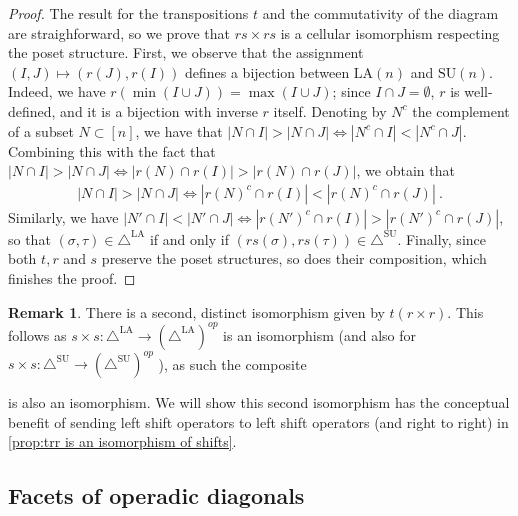 \documentclass{amsart}
\theoremstyle{definition}
\newtheorem{remark}[theorem]{Remark}
\newcommand{\SU}{\mathrm{SU}}
\newcommand{\LA}{\mathrm{LA}}
\newcommand{\SUD}{\triangle^{\mathrm{SU}}}
\newcommand{\LAD}{\triangle^{\mathrm{LA}}}
\newcommand{\op}{\mathrm{op}}
\begin{document}
\begin{proof}
    The result for the transpositions $t$ and the commutativity of the diagram are straighforward, so we prove that $rs\times rs$ is a cellular isomorphism respecting the poset structure. 
    First, we observe that the assignment $(I,J) \mapsto (r(J),r(I))$ defines a bijection between $\LA(n)$ and $\SU(n)$. 
    Indeed, we have $r(\min(I\cup J))=\max(I\cup J)$; since $I \cap J = \emptyset$, $r$ is well-defined, and it is a bijection with inverse $r$ itself.  
    Denoting by $N^c$ the complement of a subset $N \subset [n]$, we have that $|N \cap I| > |N\cap J| \iff |N^c \cap I|< |N^c \cap J|$.
    Combining this with the fact that $|N \cap I| > |N\cap J| \iff |r(N) \cap r(I)| > |r(N) \cap r(J)|$, we obtain that 
    \begin{eqnarray*}
        |N \cap I| > |N\cap J| \iff |r(N)^c \cap r(I)| < |r(N)^c \cap r(J)| \ .
    \end{eqnarray*}
    Similarly, we have $|N' \cap I| < |N'\cap J| \iff |r(N')^c \cap r(I)| > |r(N')^c \cap r(J)|$, so that $(\sigma,\tau) \in \LAD$ if and only if $(rs(\sigma),rs(\tau)) \in \SUD$. 
    Finally, since both $t,r$ and $s$ preserve the poset structures, so does their composition, which finishes the proof.
\end{proof}

\begin{remark} \label{rem:Alternate Isomorphism}
There is a second, distinct isomorphism given by $t(r\times r)$.
This follows as $s\times s:\LAD \to (\LAD)^{op}$ is an isomorphism (and also for  $s\times s:\SUD \to (\SUD)^{op}$ ), as such the composite 

\begin{center}
\end{center}
is also an isomorphism.
We will show this second isomorphism has the conceptual benefit of sending left shift operators to left shift operators (and right to right) in \cref{prop:trr is an isomorphism of shifts}.

\end{remark}


\subsection{Facets of operadic diagonals}
\end{document}
